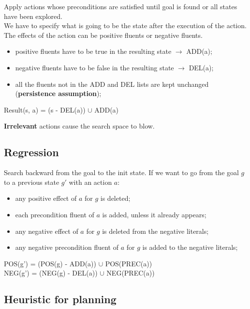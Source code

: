 \documentclass{article}
\begin{document}
Apply actions whose preconditions are satisfied until goal is found or all states have been explored. \\

We have to specify what is going to be the state after the execution of the action. The effects of the action can be positive fluents or negative fluents. 

\begin{itemize}
    \item positive fluents have to be true in the resulting state $\rightarrow$ ADD(a);
    \item negative fluents have to be false in the resulting state $\rightarrow$ DEL(a);
    \item all the fluents not in the ADD and DEL lists are kept unchanged (\textbf{persistence assumption});
\end{itemize}

\begin{center}
    Result(s, a) = (s - DEL(a)) $\cup$ ADD(a)
\end{center}

\textbf{Irrelevant} actions cause the search space to blow.

\subsection{Regression}

Search backward from the goal to the init state. If we want to go from the goal $g$ to a previous state $g'$ with an action $a$:

\begin{itemize}
    \item any positive effect of $a$ for $g$ is deleted;
    \item each precondition fluent of $a$ is added, unless it already appears;
    \item any negative effect of $a$ for $g$ is deleted from the negative literals;
    \item any negative precondition fluent of $a$ for $g$ is added to the negative literals;
\end{itemize}

\begin{center}
    POS(g') = (POS(g) - ADD(a)) $\cup$ POS(PREC(a)) \\
    NEG(g') = (NEG(g) - DEL(a)) $\cup$ NEG(PREC(a))
\end{center}

\subsection{Heuristic for planning}
\end{document}
